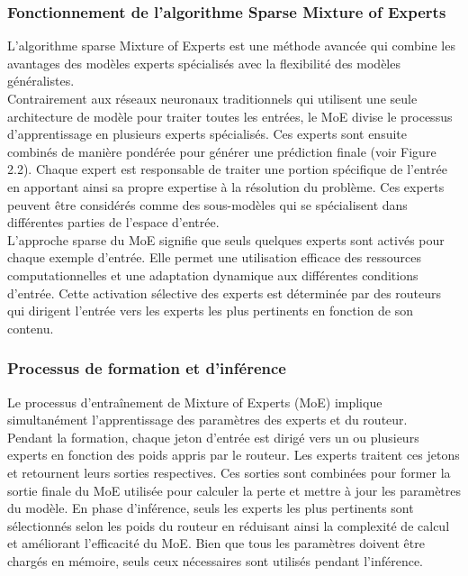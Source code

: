 \subsubsection{ Fonctionnement de l'algorithme Sparse Mixture of Experts}
\justifying
L'algorithme sparse Mixture of Experts est une méthode avancée qui combine les avantages des modèles experts spécialisés avec la flexibilité des modèles généralistes.\\
Contrairement aux réseaux neuronaux traditionnels qui utilisent une seule architecture de modèle pour traiter toutes les entrées, le MoE divise le processus d'apprentissage en plusieurs experts spécialisés. Ces experts sont ensuite combinés de manière pondérée pour générer une prédiction finale (voir Figure 2.2). Chaque expert est responsable de traiter une portion spécifique de l'entrée en apportant ainsi sa propre expertise à la résolution du problème. Ces experts peuvent être considérés comme des sous-modèles qui se spécialisent dans différentes parties de l'espace d'entrée.\\
L'approche sparse du MoE signifie que seuls quelques experts sont activés pour chaque exemple d'entrée. Elle permet une utilisation efficace des ressources computationnelles et une adaptation dynamique aux différentes conditions d'entrée. Cette activation sélective des experts est déterminée par des routeurs qui dirigent l'entrée vers les experts les plus pertinents en fonction de son contenu.

\subsubsection{Processus de formation et d'inférence}
\justifying
Le processus d'entraînement de Mixture of Experts (MoE) implique simultanément l'apprentissage des paramètres des experts et du routeur. \\
Pendant la formation, chaque jeton d'entrée est dirigé vers un ou plusieurs experts en fonction des poids appris par le routeur. Les experts traitent ces jetons et retournent leurs sorties respectives. Ces sorties sont combinées pour former la sortie finale du MoE utilisée pour calculer la perte et mettre à jour les paramètres du modèle.
En phase d'inférence, seuls les experts les plus pertinents sont sélectionnés selon les poids du routeur en réduisant ainsi la complexité de calcul et améliorant l'efficacité du MoE. Bien que tous les paramètres doivent être chargés en mémoire, seuls ceux nécessaires sont utilisés pendant l'inférence.

